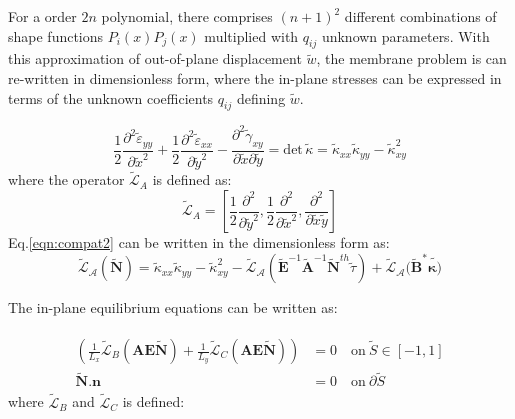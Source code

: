 \documentclass[journal]{new-aiaa}
\begin{document}
For a order $2n$ polynomial, there comprises $(n+1)^2$ different combinations of shape functions $P_i(x)P_j(x)$ multiplied with $q_{ij}$ unknown parameters.
With this approximation of out-of-plane displacement $\tilde{w}$, the membrane problem is can re-written in dimensionless form, where the in-plane stresses can be expressed in terms of the unknown coefficients $q_{ij}$ defining $\tilde{w}$. 

\begin{equation}
\label{eqn:compatnd}
\frac{1}{2}\frac{\partial^2 \tilde{\varepsilon}_{yy} }{\partial \tilde{x}^2} + \frac{1}{2}\frac{\partial^2 \tilde{\varepsilon}_{xx} }{\partial \tilde{y}^2} -
\frac{\partial^2\tilde{\gamma}_{xy} }{\partial \tilde{x}  \partial \tilde{y}}=\text{det}\,\tilde{\kappa}= \tilde{\kappa}_{xx}\tilde{\kappa}_{yy} - \tilde{\kappa}_{xy}^2
\end{equation}
where the operator $\mathcal{\tilde{L}}_A$ is defined as:
\begin{equation}
\label{eqn:Lnd}
\mathcal{\tilde{L}}_A=\left[\frac{1}{2}\frac{\partial^2 }{\partial \tilde{y}^2},\frac{1}{2}\frac{\partial^2 }{\partial \tilde{x}^2} ,\frac{\partial^2 }{\partial \tilde{x} \tilde{y}}\right]
\end{equation}
Eq.\ref{eqn:compat2} can be written in the dimensionless form as:
\begin{equation}
\label{eqn:LAN}
\mathcal{\tilde{L}_A}(\tilde{\bm{N}})=\tilde{\kappa}_{xx}\tilde{\kappa}_{yy} - \tilde{\kappa}_{xy}^2 - \mathcal{\tilde{L}_A}(\tilde{\bm{E}}^{-1}\tilde{\bm{A}}^{-1}\tilde{\bm{N}}^{th}\tilde{\tau}) + \mathcal{\tilde{L}_A}(\tilde{\bm{B}}^\ast\tilde{\bm\kappa)}
\end{equation}

The in-plane equilibrium equations can be written as:

\begin{eqnarray}
\label{eqn:LA}
\begin{aligned}
\left(\frac{1}{L_x}\mathcal{\tilde{L}}_B(\bm{A}\bm{E}\tilde{\bm{N}}) + \frac{1}{L_y}\mathcal{\tilde{L}}_C(\bm{A}\bm{E}\tilde{\bm{N}})\right)&=0 \quad  \text{on} \: \tilde{S} \in \left[-1,1\right] \\
\tilde{\bm{N}}. \boldsymbol{n} &= 0 \quad \text{on} \: \partial \tilde{S}
\end{aligned}
\end{eqnarray}
where $\mathcal{\tilde{L}}_B$ and $\mathcal{\tilde{L}}_C$ is defined:
\end{document}
